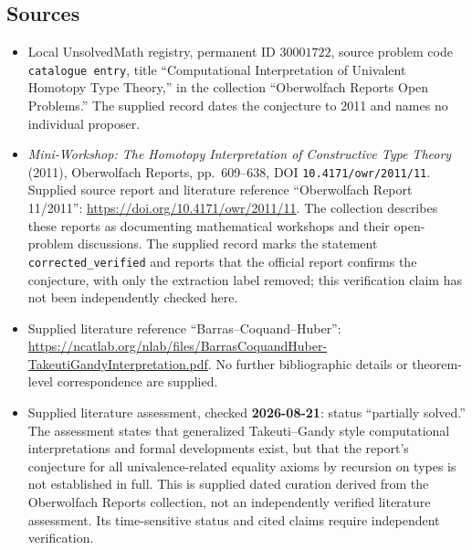 \documentclass[11pt]{article}
\begin{document}
\subsection{Sources}
\begin{itemize}
\item Local UnsolvedMath registry, permanent ID \(30001722\), source problem code \texttt{catalogue entry}, title ``Computational Interpretation of Univalent Homotopy Type Theory,'' in the collection ``Oberwolfach Reports Open Problems.'' The supplied record dates the conjecture to 2011 and names no individual proposer.
\item \emph{Mini-Workshop: The Homotopy Interpretation of Constructive Type Theory} (2011), Oberwolfach Reports, pp.\ 609--638, DOI \texttt{10.4171/owr/2011/11}. Supplied source report and literature reference ``Oberwolfach Report 11/2011'': \url{https://doi.org/10.4171/owr/2011/11}. The collection describes these reports as documenting mathematical workshops and their open-problem discussions. The supplied record marks the statement \texttt{corrected\_verified} and reports that the official report confirms the conjecture, with only the extraction label removed; this verification claim has not been independently checked here.
\item Supplied literature reference ``Barras--Coquand--Huber'': \url{https://ncatlab.org/nlab/files/BarrasCoquandHuber-TakeutiGandyInterpretation.pdf}. No further bibliographic details or theorem-level correspondence are supplied.
\item Supplied literature assessment, checked \textbf{2026-08-21}: status ``partially solved.'' The assessment states that generalized Takeuti--Gandy style computational interpretations and formal developments exist, but that the report's conjecture for all univalence-related equality axioms by recursion on types is not established in full. This is supplied dated curation derived from the Oberwolfach Reports collection, not an independently verified literature assessment. Its time-sensitive status and cited claims require independent verification.
\end{itemize}
\end{document}
